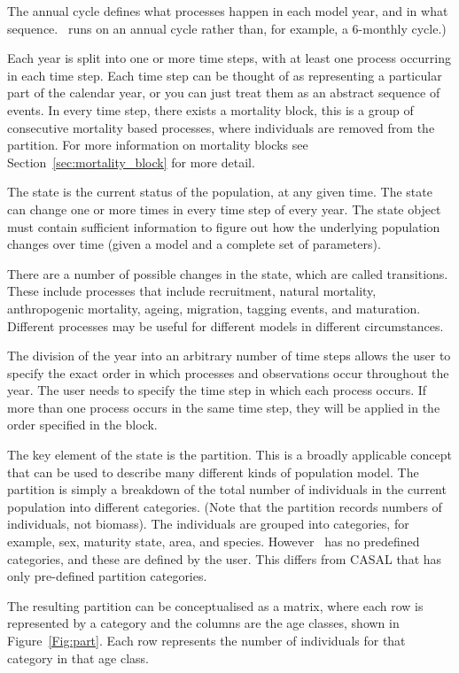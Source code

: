 The annual cycle defines what processes happen in each model year, and in what sequence. \CNAME\ runs on an annual cycle rather than, for example, a 6-monthly cycle.) 

Each year is split into one or more time steps, with at least one process occurring in each time step. Each time step can be thought of as representing a particular part of the calendar year, or you can just treat them as an abstract sequence of events. In every time step, there exists a mortality block, this is a group of consecutive mortality based processes, where individuals are removed from the partition. For more information on mortality blocks see Section~\ref{sec:mortality_block} for more detail.

The state is the current status of the population, at any given time. The state can change one or more times in every time step of every year. The state object must contain sufficient information to figure out how the underlying population changes over time (given a model and a complete set of parameters).

There are a number of possible changes in the state, which are called transitions. These include processes that include recruitment, natural mortality, anthropogenic mortality, ageing, migration, tagging events, and maturation. Different processes may be useful for different models in different circumstances.

The division of the year into an arbitrary number of time steps allows the user to specify the exact order in which processes and observations occur throughout the year. The user needs to specify the time step in which each process occurs. If more than one process occurs in the same time step, they will be applied in the order specified in the  block.

The key element of the state is the partition. This is a broadly applicable concept that can be used to describe many different kinds of population model. The partition is simply a breakdown of the total number of individuals in the current population into different categories. (Note that the partition records numbers of individuals, not biomass). The individuals are grouped into categories, for example, sex, maturity state, area, and species. However \CNAME\ has no predefined categories, and these are defined by the user. This differs from CASAL \citep{1388} that has only pre-defined partition categories. 

The resulting partition can be conceptualised as a matrix, where each row is represented by a category and the columns are the age classes, shown in Figure~\ref{Fig:part}. Each row represents the number of individuals for that category in that age class. 
	
